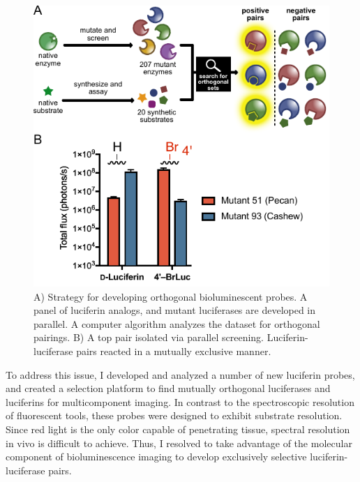 \documentclass[11pt]{article}
\begin{document}
\begin{figure}
\begin{centering}
\includegraphics[width=\textwidth]{figures/algorithmv2.pdf}
\end{centering}
\footnotesize
\caption{\label{figure:algorithm}
A) Strategy for developing orthogonal bioluminescent probes. A panel of luciferin analogs, and mutant luciferases are developed in parallel. A computer algorithm analyzes the dataset for orthogonal pairings. B) A top pair isolated via parallel screening. Luciferin-luciferase pairs reacted in a mutually exclusive manner.
}
\end{figure}

To address this issue, I developed and analyzed a number of new luciferin probes, and created a selection platform to find mutually orthogonal luciferases and luciferins for multicomponent imaging. In contrast to the spectroscopic resolution of fluorescent tools, these probes were designed to exhibit substrate resolution. Since red light is the only color capable of penetrating tissue, spectral resolution in vivo is difficult to achieve. Thus, I resolved to take advantage of the molecular component of bioluminescence imaging to develop exclusively selective luciferin-luciferase pairs.
\end{document}
